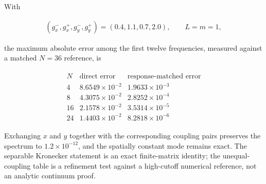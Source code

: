 With

\begin{align}
(g_x^-,g_x^+,g_y^-,g_y^+)
=(0.4,1.1,0.7,2.0),
\qquad
L=m=1,
\end{align}

the maximum absolute error among the first twelve frequencies, measured against a matched $N=36$ reference, is

\begin{align}
\begin{array}{c|cc}
N&\text{direct error}&\text{response-matched error}\\ \hline
4&8.6549\times10^{-2}&1.9633\times10^{-3}\\
8&4.3075\times10^{-2}&2.8252\times10^{-4}\\
16&2.1578\times10^{-2}&3.5314\times10^{-5}\\
24&1.4403\times10^{-2}&8.2818\times10^{-6}
\end{array}
\end{align}

Exchanging $x$ and $y$ together with the corresponding coupling pairs preserves the spectrum to $1.2\times10^{-12}$, and the spatially constant mode remains exact. The separable Kronecker statement is an exact finite-matrix identity; the unequal-coupling table is a refinement test against a high-cutoff numerical reference, not an analytic continuum proof.
